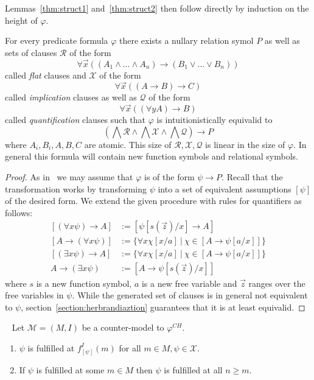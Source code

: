 \documentclass[runningheads]{llncs}
\begin{document}
Lemmas~\ref{thm:struct1} and~\ref{thm:struct2} then follow directly by induction on the height of $\varphi$.

\begin{lemma}
	For every predicate formula $\varphi$ there exists a nullary relation symol $P$ as well as sets of clauses $\mathcal R$ of the form
	$$\forall \vec x\left((A_1\wedge\dots\wedge A_n)\to (B_1\vee\dots\vee B_n)\right)$$
	called \emph{flat} clauses and $\mathcal X$ of the form
	$$\forall \vec x\left((A\to B)\to C\right)$$
	called \emph{implication} clauses as well as $\mathcal Q$ of the form
	$$\forall\vec x\left((\forall y A)\to B\right)$$
	called \emph{quantification} clauses such that $\varphi$ is intuitionistically equivalid to
	$$\left(\bigwedge\mathcal R\wedge\bigwedge \mathcal X\wedge\bigwedge\mathcal Q\right)\to P$$where $A_i, B_i, A, B, C$ are atomic. This size of $\mathcal R, \mathcal X, \mathcal Q$ is linear in the size of $\varphi$. In general this formula will contain new function symbols and relational symbols.
\end{lemma}

\begin{proof}\label{proof:first-order-normal-form}
	As in~\cite{otten2005clausal} we may assume that $\varphi$ is of the form $\psi\to P$. Recall that the transformation works by transforming $\psi$ into a set of equivalent assumptions $\left\lbrack \psi\right\rbrack$ of the desired form. We extend the given procedure with rules for quantifiers as follows:
	\begin{align*}
		\left\lbrack(\forall x \psi)\to A\right\rbrack&:= \left\lbrack\psi[s(\vec z)/x]\to A\right\rbrack\\
		\left\lbrack A\to (\forall x\psi)\right\rbrack&:= \{\forall x\chi[x/a]\:|\:\chi\in\left\lbrack A\to\psi[a/x]\right\rbrack\}\\
		\left\lbrack(\exists x\psi)\to A\right\rbrack&:= \{\forall x\chi[x/a]\:|\:\chi\in\left\lbrack A\to\psi[a/x]\right\rbrack\}\\
		A\to (\exists x\psi)&:= \left\lbrack A\to\psi[s(\vec z)/x]\right\rbrack
	\end{align*}
	where $s$ is a new function symbol, $a$ is a new free variable and $\vec z$ ranges over the free variables in $\psi$.
	While the generated set of clauses is in general not equivalent to $\psi$, section~\ref{section:herbrandiaztion} guarantees that it is at least equivalid.
\end{proof}

\begin{lemma}~\label{proof:prop-countermodel-reduction}
	Let $\mathcal M = (M, I)$ be a counter-model to $\mathcal \varphi^{CH}$.
	\begin{enumerate}
		\item $\psi$ is fulfilled at $f_{[\psi]}^I(m)$ for all $m\in M, \psi\in\mathcal X$.
		\item If $\psi$ is fulfilled at some $m\in M$ then $\psi$ is fulfilled at all $n\geq m$.
	\end{enumerate}
\end{lemma}
\end{document}
